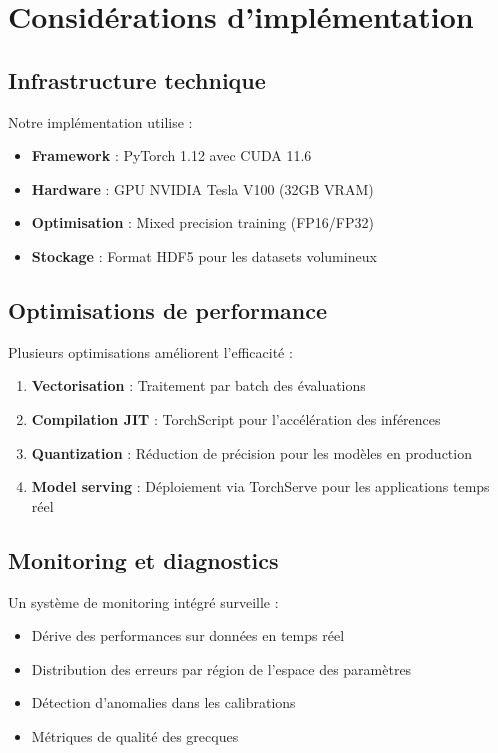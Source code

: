 \section{Considérations d'implémentation}

\subsection{Infrastructure technique}

Notre implémentation utilise :
\begin{itemize}
\item \textbf{Framework} : PyTorch 1.12 avec CUDA 11.6
\item \textbf{Hardware} : GPU NVIDIA Tesla V100 (32GB VRAM)
\item \textbf{Optimisation} : Mixed precision training (FP16/FP32)
\item \textbf{Stockage} : Format HDF5 pour les datasets volumineux
\end{itemize}

\subsection{Optimisations de performance}

Plusieurs optimisations améliorent l'efficacité :

\begin{enumerate}
\item \textbf{Vectorisation} : Traitement par batch des évaluations
\item \textbf{Compilation JIT} : TorchScript pour l'accélération des inférences
\item \textbf{Quantization} : Réduction de précision pour les modèles en production
\item \textbf{Model serving} : Déploiement via TorchServe pour les applications temps réel
\end{enumerate}

\subsection{Monitoring et diagnostics}

Un système de monitoring intégré surveille :
\begin{itemize}
\item Dérive des performances sur données en temps réel
\item Distribution des erreurs par région de l'espace des paramètres
\item Détection d'anomalies dans les calibrations
\item Métriques de qualité des grecques
\end{itemize}

